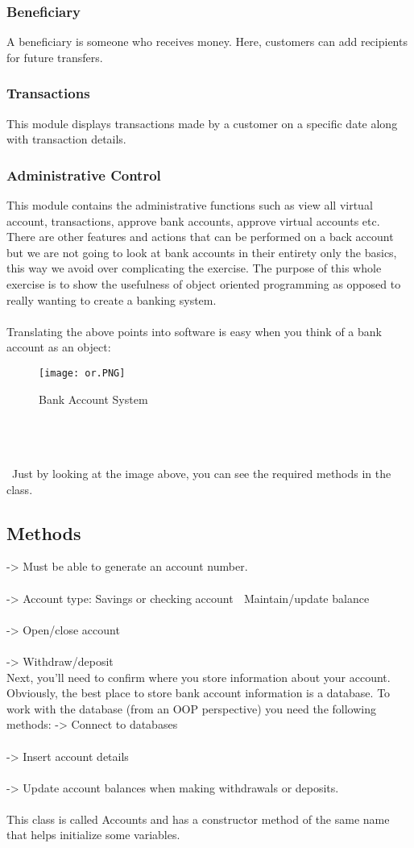 \documentclass{article}
\begin{document}
\subsubsection{Beneficiary}
A beneficiary is someone who receives money. Here, customers can add recipients for future transfers.
\subsubsection{Transactions}
This module displays transactions made by a customer on a specific date along with transaction details.
\subsubsection{Administrative Control}
This module contains the administrative functions such as view  all  virtual  account,  transactions,  approve  bank  accounts,  approve  virtual accounts etc. \hfill \break \hfill \break \hfill \break
There are other features and actions that can be performed on a back account but we are not going to  look  at  bank  accounts in  their  entirety only the  basics, this  way we  avoid  over complicating the exercise. The purpose of this whole exercise is to show the usefulness of object  oriented  programming  as  opposed  to  really  wanting  to  create  a  banking  system.\\\\
Translating the above points into software is easy when you think of a bank account as an object:
\begin{figure}[htp]
    \centering
    \texttt{[image: or.PNG]}
    \caption{Bank Account System }
    \label{fig:Bank Account System }
\end{figure}
\\\\\\\
Just by looking at the image above, you can see the required methods in the class.
\subsection{Methods}
-> Must be able to generate an account number.\\\\ -> Account type:
Savings or checking account  Maintain/update balance\\\\ -> Open/close account \\\\-> Withdraw/deposit
\\ \hfill \break
Next, you'll need to confirm where you store information about your account. Obviously, the best place to store bank account information is a database. To work with the database (from an OOP perspective) you need the following methods:
-> Connect to databases \\\\ -> Insert account details \\\\ -> Update account balances when making withdrawals or deposits.
\\\\
This class is called Accounts and has a constructor method of the same name that helps initialize some variables.
\end{document}
